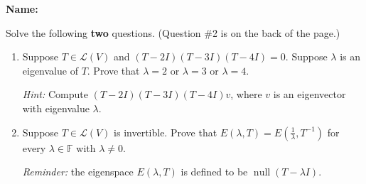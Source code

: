\documentclass[12pt]{article}
\newcommand{\points}[1]{\marginpar{\hspace{24pt}[#1]}}
\DeclareMathOperator{\nul}{null}
\begin{document}
\thispagestyle{fancy}
{\bf Name:}

\bigskip

Solve the following {\bf two} questions. (Question \#2 is on the back of the page.)
 \begin{enumerate}
 \item Suppose $T\in\mathcal{L}(V)$ and $(T-2I)(T-3I)(T-4I)=0$. Suppose $\lambda$ is an eigenvalue of $T$. Prove that $\lambda =2$ or $\lambda =3$ or $\lambda=4$.\points{5}

{\em Hint:} Compute $(T-2I)(T-3I)(T-4I)v$, where $v$ is an eigenvector with eigenvalue $\lambda$.

\newpage

 \item Suppose $T\in\mathcal{L}(V)$ is invertible. Prove that $E(\lambda, T)=E(\frac{1}{\lambda},T^{-1})$ for every $\lambda\in\mathbb{F}$ with $\lambda\neq 0$.

{\em Reminder:} the eigenspace $E(\lambda, T)$ is defined to be $\nul(T-\lambda I)$.
 \end{enumerate}
\end{document}
